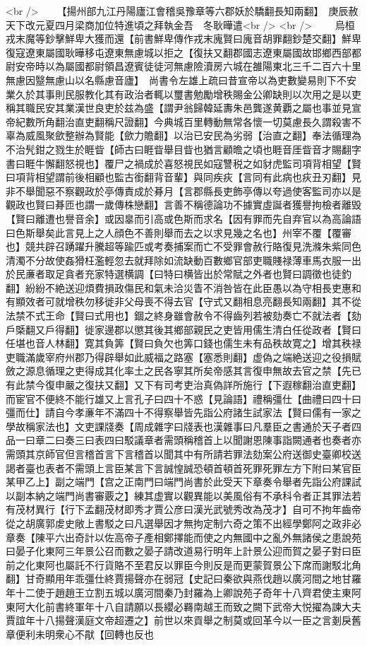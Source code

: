 <br />
　　【揚州部九江丹陽廬江會稽吳豫章等六郡妖於驕翻長知兩翻】　庚辰赦天下改元夏四月梁商加位特進頃之拜執金吾　冬耿曄遣<br />
<br />
　　烏桓戎末魔等鈔擊鮮卑大獲而還【前書鮮卑傳作戎末廆賢曰廆音胡罪翻鈔楚交翻】鮮卑復寇遼東屬國耿曄移屯遼東無慮城以拒之【復扶又翻郡國志遼東屬國故邯鄉西部都尉安帝時以為屬國都尉領昌遼賓徒徒河無慮險瀆房六城在雒陽東北三千二百六十里無慮因毉無慮山以名縣慮音廬】　尚書令左雄上疏曰昔宣帝以為吏數變易則下不安業久於其事則民服教化其有政治者輒以璽書勉勵增秩賜金公卿缺則以次用之是以吏稱其職民安其業漢世良吏於兹為盛【謂尹翁歸韓延夀朱邑龔遂黄覇之屬也事並見宣帝紀數所角翻治直吏翻稱尺證翻】今典城百里轉動無常各懷一切莫慮長久謂殺害不辜為威風聚歛整辦為賢能【歛力贍翻】以治已安民為劣弱【治直之翻】奉法循理為不治髠鉗之戮生於睚眥【師古曰睚眥舉目眥也猶言顧曕之頃也睚音厓眥音才賜翻字書曰睚牛懈翻怒視也】覆尸之禍成於喜怒視民如寇讐税之如豺虎監司項背相望【賢曰項背相望謂前後相顧也監古銜翻背音輩】與同疾疢【言同有此病也疢丑刃翻】見非不舉聞惡不察觀政於亭傳責成於朞月【言郡縣長吏飾亭傳以夸過使客監司亦以是觀政也賢曰朞匝也謂一歲傳株戀翻】言善不稱德論功不據實虛誕者獲譽拘檢者離毁【賢曰離遭也譽音余】或因辠而引高或色斯而求名【因有罪而先自弃官以為高論語曰色斯舉矣此言見上之人顔色不善則舉而去之以求見幾之名也】州宰不覆【覆審也】競共辟召踴躍升騰超等踰匹或考奏捕案而亡不受罪會赦行賂復見洗滌朱紫同色清濁不分故使姦猾枉濫輕忽去就拜除如流缺動百數鄉官部吏職賤禄薄車馬衣服一出於民亷者取足貪者充家特選横調【曰特曰横皆出於常賦之外者也賢曰調徵也徒釣翻】紛紛不絶送迎煩費損政傷民和氣未洽災眚不消咎皆在此臣愚以為守相長吏惠和有顯效者可就增秩勿移徙非父母喪不得去官【守式又翻相息亮翻長知兩翻】其不從法禁不式王命【賢曰式用也】錮之終身雖會赦令不得齒列若被劾奏亡不就法者【劾戶㮣翻又戶得翻】徙家邊郡以懲其後其鄉部親民之吏皆用儒生清白任從政者【賢曰任堪也音人林翻】寛其負筭【賢曰負欠也筭口錢也儒生未有品秩故寛之】增其秩禄吏職滿歲宰府州郡乃得辟舉如此威福之路塞【塞悉則翻】虚偽之端絶送迎之役損賦斂之源息循理之吏得成其化率土之民各寧其所矣帝感其言復申無故去官之禁【先已有此禁今復申嚴之復扶又翻】又下有司考吏治真偽詳所施行【下遐稼翻治直吏翻】而宦官不便終不能行雄又上言孔子曰四十不惑【見論語】禮稱彊仕【曲禮曰四十曰彊而仕】請自今孝亷年不滿四十不得察舉皆先詣公府諸生試家法【賢曰儒有一家之學故稱家法也】文吏課牋奏【周成雜字曰牋表也漢雜事曰凡羣臣之書通於天子者四品一曰章二曰奏三曰表四曰駁議章者需頭稱稽首上以聞謝恩陳事詣闕通者也奏者亦需頭其京師官但言稽首言下言稽首以聞其中有所請若罪法劾案公府送御史臺卿校送謁者臺也表者不需頭上言臣某言下言誠惶誠恐頓首頓首死罪死罪左方下附曰某官臣某甲乙上】副之端門【宫之正南門曰端門尚書於此受天下章奏令舉者先詣公府課試以副本納之端門尚書審覈之】練其虚實以觀異能以美風俗有不承科令者正其罪法若有茂材異行【行下孟翻茂材即秀才賈公彦曰漢光武號秀改為茂才】自可不拘年齒帝從之胡廣郭䖍史敞上書駁之曰凡選舉因才無拘定制六奇之策不出經學鄭阿之政非必章奏【陳平六出奇計以佐高帝子產相鄭擇能而使之内無國中之亂外無諸侯之患說苑曰晏子化東阿三年景公召而數之晏子請改道易行明年上計景公迎而賀之晏子對曰臣前之化東阿也屬託不行貨賂不至君反以罪臣今則反是而更蒙賀景公下席而謝駁北角翻】甘奇顯用年乖彊仕終賈揚聲亦在弱冠【史記曰秦欲與燕伐趙以廣河間之地甘羅年十二使于趙趙王立割五城以廣河間秦乃封羅為上卿說苑子奇年十八齊君使主東阿東阿大化前書終軍年十八自請願以長纓必羇南越王而致之闕下武帝大悦擢為諫大夫賈誼年十八揚聲漢庭文帝超遷之】前世以來貢舉之制莫或回革今以一臣之言剗戾舊章便利未明衆心不猒【回轉也反也